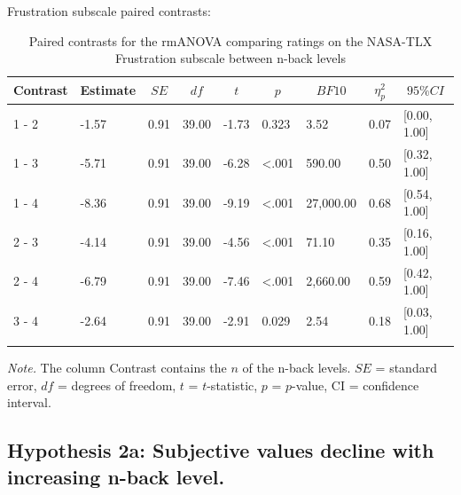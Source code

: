 \documentclass[
  man,floatsintext]{apa6}
\begin{document}
Frustration subscale paired contrasts:

\begin{table}[H]

\begin{center}
\begin{threeparttable}

\caption{\label{tab:unnamed-chunk-7}Paired contrasts for the rmANOVA comparing ratings on the NASA-TLX Frustration subscale between n-back levels}

\begin{tabular}{lllllllll}
\toprule
Contrast & \multicolumn{1}{c}{Estimate} & \multicolumn{1}{c}{$SE$} & \multicolumn{1}{c}{$df$} & \multicolumn{1}{c}{$t$} & \multicolumn{1}{c}{$p$} & \multicolumn{1}{c}{$BF10$} & \multicolumn{1}{c}{$\eta_{p}^{2}$} & \multicolumn{1}{c}{$95\% CI$}\\
\midrule
1 - 2 & -1.57 & 0.91 & 39.00 & -1.73 & 0.323 & 3.52 & 0.07 & {}[0.00, 1.00]\\
1 - 3 & -5.71 & 0.91 & 39.00 & -6.28 & <.001 & 590.00 & 0.50 & {}[0.32, 1.00]\\
1 - 4 & -8.36 & 0.91 & 39.00 & -9.19 & <.001 & 27,000.00 & 0.68 & {}[0.54, 1.00]\\
2 - 3 & -4.14 & 0.91 & 39.00 & -4.56 & <.001 & 71.10 & 0.35 & {}[0.16, 1.00]\\
2 - 4 & -6.79 & 0.91 & 39.00 & -7.46 & <.001 & 2,660.00 & 0.59 & {}[0.42, 1.00]\\
3 - 4 & -2.64 & 0.91 & 39.00 & -2.91 & 0.029 & 2.54 & 0.18 & {}[0.03, 1.00]\\
\bottomrule
\addlinespace
\end{tabular}

\begin{tablenotes}[para]
\normalsize{\textit{Note.} The column Contrast contains the $n$ of the n-back levels. $SE$ = standard error, $df$ = degrees of freedom, $t$ = $t$-statistic, $p$ = $p$-value, CI = confidence interval.}
\end{tablenotes}

\end{threeparttable}
\end{center}

\end{table}

\newpage

\hypertarget{hypothesis-2a-subjective-values-decline-with-increasing-n-back-level.}{%
\subsection{Hypothesis 2a: Subjective values decline with increasing n-back level.}\label{hypothesis-2a-subjective-values-decline-with-increasing-n-back-level.}}
\end{document}
